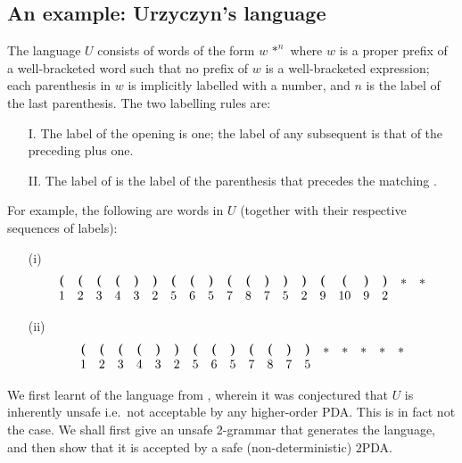 \subsection{An example: Urzyczyn's language} The
language $U$ consists of words of the form $w \, \ast^n$ where $w$
is a proper prefix of a well-bracketed word such that no prefix of
$w$ is a well-bracketed expression; each parenthesis in $w$ is
implicitly labelled with a number, and $n$ is the label of the
last parenthesis. The two labelling rules are:
\begin{itemize}
\item[I.] The label of the opening \hbox{\pq} is one; the label of any
subsequent \hbox{\pq} is that of the preceding \hbox{\pq} plus one.

\item[II.] The label of \hbox{\oa} is the label of the parenthesis that
precedes the matching \hbox{\pq}.
\end{itemize}
For example, the following are words in $U$
(together with their respective sequences of labels):
\begin{itemize}
\item[(i)]
\[\begin{array}{cccccccccccccccccccc}
{\sf \textbf{(}} & {\sf \textbf{(}} & {\sf \textbf{(}} & {\sf \textbf{(}} & {\sf \textbf{)}} & {\sf \textbf{)}} & {\sf \textbf{(}}  & {\sf \textbf{(}} & {\sf \textbf{)}} & {\sf \textbf{(}} & {\sf \textbf{(}} & {\sf \textbf{)}} & {\sf \textbf{)}} & {\sf \textbf{)}} & {\sf \textbf{(}} & {\sf \textbf{(}}  & {\sf \textbf{)}} & {\sf \textbf{)}} & \ast & \ast \\
1 & 2 & 3 & 4 & 3 & 2 & 5  & 6 & 5 & 7 & 8 & 7 & 5 & 2 & 9 & 10 & 9 & 2 &   &
\end{array}\]
\item[(ii)]
\[\begin{array}{cccccccccccccccccc}
{\sf \textbf{(}}  & {\sf \textbf{(}} & {\sf \textbf{(}} & {\sf \textbf{(}} & {\sf \textbf{)}} & {\sf \textbf{)}} & {\sf \textbf{(}} & {\sf \textbf{(}} & {\sf \textbf{)}} & {\sf \textbf{(}} & {\sf \textbf{(}} & {\sf \textbf{)}} & {\sf \textbf{)}} & \ast &\ast &\ast &\ast &\ast\\
1 &  2 & 3 & 4 & 3 & 2 & 5 & 6 & 5 & 7 & 8 & 7 & 5 & \\
\end{array}\]
\end{itemize}
We first learnt of the language from \cite{Urz03}, wherein it was
conjectured that $U$ is inherently unsafe i.e.~not acceptable by
any higher-order PDA. This is in fact not the case. We shall first
give an unsafe 2-grammar that generates the language, and then
show that it is accepted by a safe (non-deterministic) $2$PDA.

\medskip

